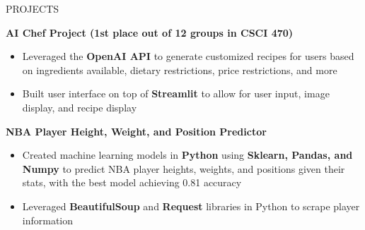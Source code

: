 \documentclass{resume} %
\begin{document}

\begin{rSection}{PROJECTS}

\textbf{AI Chef Project (1st place out of 12 groups in CSCI 470)} \hfill %
\vspace{-6pt}
 \begin{itemize}[leftmargin=*]
    \itemsep -6pt {} 
     \item Leveraged the \textbf{OpenAI API} to generate customized recipes for users based on ingredients available, dietary restrictions, price restrictions, and more
     \item Built user interface on top of \textbf{Streamlit} to allow for user input, image display, and recipe display
 \end{itemize}

\textbf{NBA Player Height, Weight, and Position Predictor} %
\vspace{-6pt}
 \begin{itemize}[leftmargin=*]
    \itemsep -6pt {} 
     \item Created machine learning models in \textbf{Python} using \textbf{Sklearn, Pandas, and Numpy} to predict NBA player heights, weights, and positions given their stats, with the best model achieving 0.81 accuracy
     \item Leveraged \textbf{BeautifulSoup} and \textbf{Request} libraries in Python to scrape player information
 \end{itemize}
 
\end{rSection} 
\vspace{-6pt}

\end{document}
